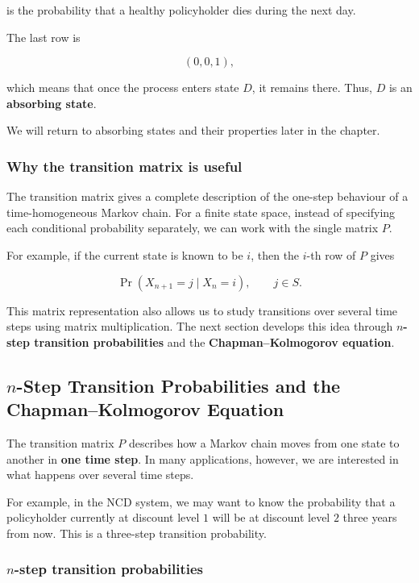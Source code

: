 \documentclass[
  letterpaper,
  DIV=11,
  numbers=noendperiod]{scrartcl}
\theoremstyle{definition}
\theoremstyle{remark}
\begin{document}
is the probability that a healthy policyholder dies during the next day.

The last row is

\[
(0,0,1),
\]

which means that once the process enters state \(D\), it remains there.
Thus, \(D\) is an \textbf{absorbing state}.

We will return to absorbing states and their properties later in the
chapter.

\subsubsection{Why the transition matrix is
useful}\label{why-the-transition-matrix-is-useful}

The transition matrix gives a complete description of the one-step
behaviour of a time-homogeneous Markov chain. For a finite state space,
instead of specifying each conditional probability separately, we can
work with the single matrix \(P\).

For example, if the current state is known to be \(i\), then the
\(i\)-th row of \(P\) gives

\[
\Pr(X_{n+1}=j\mid X_n=i),
\qquad j\in S.
\]

This matrix representation also allows us to study transitions over
several time steps using matrix multiplication. The next section
develops this idea through \textbf{\(n\)-step transition probabilities}
and the \textbf{Chapman--Kolmogorov equation}.

\subsection{\texorpdfstring{\(n\)-Step Transition Probabilities and the
Chapman--Kolmogorov
Equation}{n-Step Transition Probabilities and the Chapman--Kolmogorov Equation}}\label{n-step-transition-probabilities-and-the-chapmankolmogorov-equation}

The transition matrix \(P\) describes how a Markov chain moves from one
state to another in \textbf{one time step}. In many applications,
however, we are interested in what happens over several time steps.

For example, in the NCD system, we may want to know the probability that
a policyholder currently at discount level \(1\) will be at discount
level \(2\) three years from now. This is a three-step transition
probability.

\subsubsection{\texorpdfstring{\(n\)-step transition
probabilities}{n-step transition probabilities}}\label{n-step-transition-probabilities}
\end{document}
